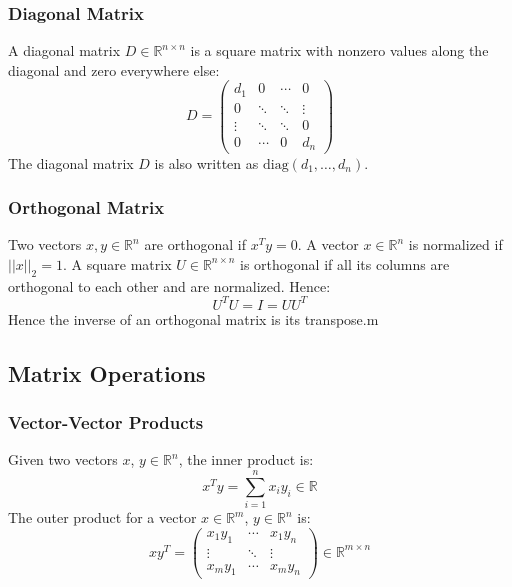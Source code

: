 \documentclass[twoside,twocolumn]{article}
\begin{document}
\subsubsection{Diagonal Matrix}
A diagonal matrix $D \in \mathbb{R}^{n \times n}$
is a square matrix with nonzero values along the diagonal and zero everywhere
else:
\begin{equation}
  D=\left(\begin{array}{cccc}d_1&0& \cdots&0\\0& \ddots& \ddots& \vdots\\\vdots& \ddots& \ddots&0\\0& \cdots&0&d_n\end{array}\right)
\end{equation}
The diagonal matrix $D$ is also written as $\textrm{diag}(d_1,\hdots,d_n)$.
\subsubsection{Orthogonal Matrix}
Two vectors $x, y \in \mathbb{R}^n$ are orthogonal if $x^T y = 0$. A vector
$x \in \mathbb{R}^n$ is normalized if $||x||_2 = 1$.
A square matrix $U\in \mathbb{R}^{n \times n}$ is orthogonal if all its
columns are orthogonal to each other and are normalized. Hence:
\begin{equation}
  U^TU = I = UU^T
\end{equation}
Hence the inverse of an orthogonal matrix is its transpose.m
\subsection{Matrix Operations}
\subsubsection{Vector-Vector Products}
Given two vectors $x$, $y \in \mathbb{R}^n$, the inner product is:
\begin{equation}
  x^T y = \sum_{i=1}^n x_i y_i \in \mathbb{R}
\end{equation}
The outer product for a vector $x \in \mathbb{R}^m$, $y \in \mathbb{R}^n$ is:
\begin{equation}
  xy^T=\left(\begin{array}{ccc}x_1y_1& \cdots&x_1y_n\\\vdots&\ddots& \vdots\\x_my_1& \cdots&x_my_n\end{array}\right)\in\mathbb{R}^{m\times n}
\end{equation}
\end{document}
